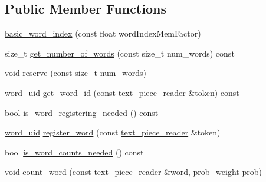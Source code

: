 \subsection*{Public Member Functions}
\begin{DoxyCompactItemize}
\item 
\hyperlink{classuva_1_1smt_1_1bpbd_1_1server_1_1lm_1_1dictionary_1_1basic__word__index_aadbe4d52e8364df91f242e6f9fd86234}{basic\+\_\+word\+\_\+index} (const float word\+Index\+Mem\+Factor)
\item 
size\+\_\+t \hyperlink{classuva_1_1smt_1_1bpbd_1_1server_1_1lm_1_1dictionary_1_1basic__word__index_a2e6562b6e3c323bc626d9301cf196cf7}{get\+\_\+number\+\_\+of\+\_\+words} (const size\+\_\+t num\+\_\+words) const 
\item 
void \hyperlink{classuva_1_1smt_1_1bpbd_1_1server_1_1lm_1_1dictionary_1_1basic__word__index_a277ab4195560f7760caba857109d64a5}{reserve} (const size\+\_\+t num\+\_\+words)
\item 
\hyperlink{namespaceuva_1_1smt_1_1bpbd_1_1server_a6bfe45ba344d65a7fdd7d26156328ddc}{word\+\_\+uid} \hyperlink{classuva_1_1smt_1_1bpbd_1_1server_1_1lm_1_1dictionary_1_1basic__word__index_a111312606be4e4d17b5209e5bc399811}{get\+\_\+word\+\_\+id} (const \hyperlink{classuva_1_1utils_1_1file_1_1text__piece__reader}{text\+\_\+piece\+\_\+reader} \&token) const 
\item 
bool \hyperlink{classuva_1_1smt_1_1bpbd_1_1server_1_1lm_1_1dictionary_1_1basic__word__index_a60b55124e8f0fea219dff9ca76fdf51a}{is\+\_\+word\+\_\+registering\+\_\+needed} () const 
\item 
\hyperlink{namespaceuva_1_1smt_1_1bpbd_1_1server_a6bfe45ba344d65a7fdd7d26156328ddc}{word\+\_\+uid} \hyperlink{classuva_1_1smt_1_1bpbd_1_1server_1_1lm_1_1dictionary_1_1basic__word__index_a7ae44d0a48a107ff9c1160b46ee4df6e}{register\+\_\+word} (const \hyperlink{classuva_1_1utils_1_1file_1_1text__piece__reader}{text\+\_\+piece\+\_\+reader} \&token)
\item 
bool \hyperlink{classuva_1_1smt_1_1bpbd_1_1server_1_1lm_1_1dictionary_1_1basic__word__index_a4f13e6413dd71a283d391a98a6949c55}{is\+\_\+word\+\_\+counts\+\_\+needed} () const 
\item 
void \hyperlink{classuva_1_1smt_1_1bpbd_1_1server_1_1lm_1_1dictionary_1_1basic__word__index_ad760fd42e1106877001577f453a0a3ea}{count\+\_\+word} (const \hyperlink{classuva_1_1utils_1_1file_1_1text__piece__reader}{text\+\_\+piece\+\_\+reader} \&word, \hyperlink{namespaceuva_1_1smt_1_1bpbd_1_1server_a01e9ea4de9c226f4464862e84ff0bbcc}{prob\+\_\+weight} prob)

\end{DoxyCompactItemize}
